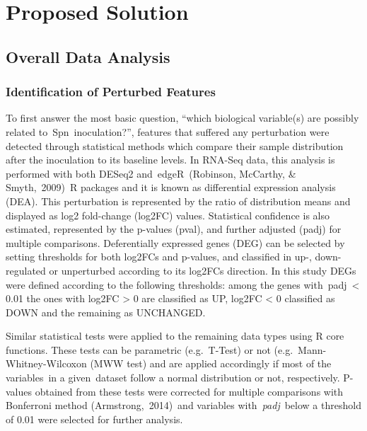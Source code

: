 \documentclass[
]{book}
\begin{document}
\hypertarget{proposed-solution}{%
\section{Proposed Solution}\label{proposed-solution}}

\hypertarget{overall-data-analysis}{%
\subsection{Overall Data Analysis}\label{overall-data-analysis}}

\hypertarget{identification-of-perturbed-features}{%
\subsubsection{Identification of Perturbed Features}\label{identification-of-perturbed-features}}

To first answer the most basic question, ``which biological variable(s) are possibly related to~Spn~inoculation?'', features that suffered any perturbation were detected through statistical methods which compare their sample distribution after the inoculation to its baseline levels. In RNA-Seq data, this analysis is performed with both DESeq2 and~edgeR~(Robinson, McCarthy, \& Smyth,~2009)⁠~R packages and it is known as differential expression analysis (DEA). This perturbation is represented by the ratio of distribution means and displayed as log2 fold-change (log2FC) values. Statistical confidence is also estimated, represented by the p-values (pval), and further adjusted (padj) for multiple comparisons. Deferentially expressed genes (DEG) can be selected by setting thresholds for both log2FCs and p-values, and classified in up-, down-regulated or unperturbed according to its log2FCs direction. In this study DEGs were defined according to the following thresholds: among the genes with~padj~\textless{} 0.01 the ones with log2FC \textgreater{} 0 are classified as UP, log2FC \textless{} 0 classified as DOWN and the remaining as UNCHANGED.

Similar statistical tests were applied to the remaining data types using R core functions. These tests can be parametric (e.g.~T-Test) or not (e.g.~Mann-Whitney-Wilcoxon (MWW test) and are applied accordingly if most of the variables~in a given~dataset follow a normal distribution or not, respectively. P-values obtained from these tests were corrected for multiple comparisons with Bonferroni method (Armstrong,~2014)⁠~and variables with~\emph{padj}~below a threshold of 0.01 were selected for further analysis.
\end{document}
